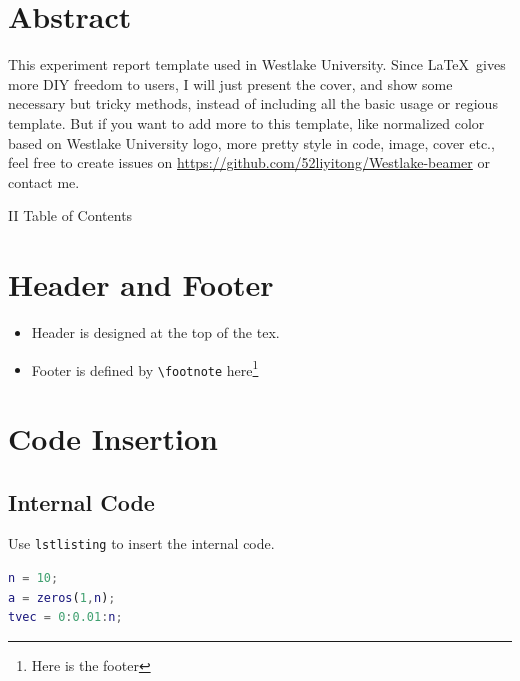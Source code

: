 \documentclass{article}
\begin{document}

\section*{Abstract} %

This experiment report template used in Westlake University. Since \LaTeX\, gives more DIY freedom to users, I will just present the cover, and show some necessary but tricky methods, instead of including all the basic usage or regious template. But if you want to add more to this template, like normalized color based on Westlake University logo, more pretty style in code, image, cover etc., feel free to create issues on \href{https://github.com/52liyitong/Westlake-beamer}{https://github.com/52liyitong/Westlake-beamer}  or contact me.


\clearpage

II
Table of Contents
\tableofcontents
\setcounter{page}{2}
\newpage



\setcounter{page}{1}

\section{Header and Footer}
    \begin{itemize}
        \item Header is designed at the top of the tex.
        \item Footer is defined by \verb|\footnote| here\footnote{Here is the footer}
    \end{itemize}
    

\section{Code Insertion}

\subsection{Internal Code}
Use \verb|lstlisting| to insert the internal code.
\begin{lstlisting}[language=MATLAB, title = MATLAB]
n = 10;
a = zeros(1,n);
tvec = 0:0.01:n;
\end{lstlisting}
\end{document}
